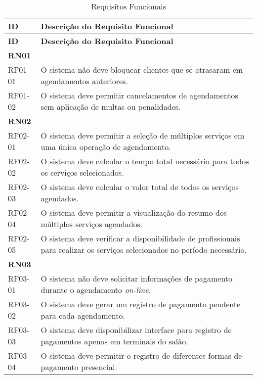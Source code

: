 \begin{longtable}{|p{}|p{}|}
	\caption{Requisitos Funcionais} \label{tab:requisitos-funcionais}\\
	\hline
	\textbf{ID} & \textbf{Descrição do Requisito Funcional} \\
	\hline
	\endfirsthead
	
	\hline
	\textbf{ID} & \textbf{Descrição do Requisito Funcional} \\
	\hline
	\endhead
	
	\multicolumn{2}{|l|}{\textbf{RN01}} \\ \hline
	RF01-01 & O sistema não deve bloquear clientes que se atrasaram em agendamentos anteriores. \\ \hline
	RF01-02 & O sistema deve permitir cancelamentos de agendamentos sem aplicação de multas ou penalidades. \\ \hline
	
	\multicolumn{2}{|l|}{\textbf{RN02}} \\ \hline
	RF02-01 & O sistema deve permitir a seleção de múltiplos serviços em uma única operação de agendamento. \\ \hline
	RF02-02 & O sistema deve calcular o tempo total necessário para todos os serviços selecionados. \\ \hline
	RF02-03 & O sistema deve calcular o valor total de todos os serviços agendados. \\ \hline
	RF02-04 & O sistema deve permitir a visualização do resumo dos múltiplos serviços agendados. \\ \hline
	RF02-05 & O sistema deve verificar a disponibilidade de profissionais para realizar os serviços selecionados no período necessário. \\ \hline
	
	\multicolumn{2}{|l|}{\textbf{RN03}} \\ \hline
	RF03-01 & O sistema não deve solicitar informações de pagamento durante o agendamento \emph{on-line}. \\ \hline
	RF03-02 & O sistema deve gerar um registro de pagamento pendente para cada agendamento. \\ \hline
	RF03-03 & O sistema deve disponibilizar interface para registro de pagamentos apenas em terminais do salão. \\ \hline
	RF03-04 & O sistema deve permitir o registro de diferentes formas de pagamento presencial. \\ \hline
	

\end{longtable}
